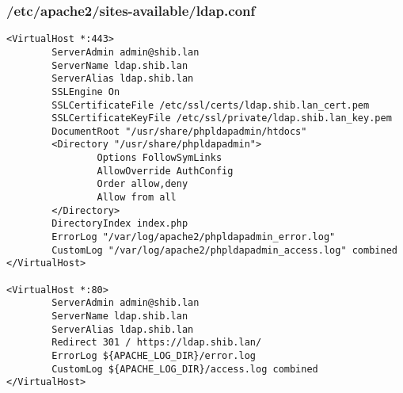 \subsubsection{/etc/apache2/sites-available/ldap.conf}
\begin{lstlisting}
<VirtualHost *:443>
        ServerAdmin admin@shib.lan
        ServerName ldap.shib.lan
        ServerAlias ldap.shib.lan
        SSLEngine On
        SSLCertificateFile /etc/ssl/certs/ldap.shib.lan_cert.pem
        SSLCertificateKeyFile /etc/ssl/private/ldap.shib.lan_key.pem
        DocumentRoot "/usr/share/phpldapadmin/htdocs"
        <Directory "/usr/share/phpldapadmin">
                Options FollowSymLinks
                AllowOverride AuthConfig
                Order allow,deny
                Allow from all
        </Directory>
        DirectoryIndex index.php
        ErrorLog "/var/log/apache2/phpldapadmin_error.log"
        CustomLog "/var/log/apache2/phpldapadmin_access.log" combined
</VirtualHost>

<VirtualHost *:80>
        ServerAdmin admin@shib.lan
        ServerName ldap.shib.lan
        ServerAlias ldap.shib.lan 
        Redirect 301 / https://ldap.shib.lan/
        ErrorLog ${APACHE_LOG_DIR}/error.log
        CustomLog ${APACHE_LOG_DIR}/access.log combined
</VirtualHost>
\end{lstlisting}

